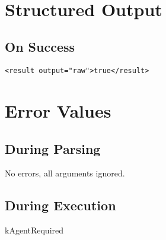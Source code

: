 \documentclass[10pt]{article}
\begin{document}
 \\ 

\section*{ Structured Output }
\subsection*{ On Success }
\begin{verbatim}
<result output="raw">true</result>

\end{verbatim}
\section*{ Error Values }
\subsection*{ During Parsing }


 No errors, all arguments ignored. 
\subsection*{ During Execution }


 kAgentRequired
\end{document}
